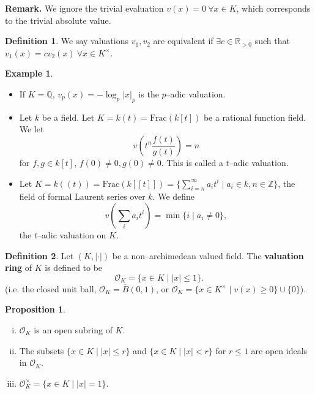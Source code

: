 \documentclass{article}
\theoremstyle{definition}
\newtheorem{prop}[theorem]{Proposition}
\newtheorem{example}{Example}[section]
\newtheorem{defn}{Definition}[section]
\begin{document}
\textbf{Remark.} We ignore the trivial evaluation $v(x)=0 ~\forall x \in K$, which  corresponds to the trivial absolute value.

\begin{defn}
    We say valuations $v_1,v_2$ are equivalent if $\exists c \in \mathbb{R}_{>0}$ such that $v_1(x) = cv_2(x) ~\forall x \in K^{\times}$.
\end{defn}
\begin{example}
    \begin{itemize}
        \item If $K=\mathbb{Q}$, $v_p(x) = -\log_p |x|_p$ is the $p$--adic valuation.
        \item Let $k$ be a field. Let $K=k(t) = \text{Frac}(k[t])$ be a rational function field. We let \[
        v\left(t^n \frac{f(t)}{g(t)}\right) = n
        \]
        for $f, g \in k[t]$, $f(0)\neq 0, g(0) \neq 0$. This is called a $t$--adic valuation.
        \item Let $K = k((t)) = \text{Frac}(k[[t]]) = \{\sum_{i=n}^{\infty} a_i t^i \mid a_i \in k, n \in \mathbb{Z}\}$, the field of formal Laurent series over $k$. We define \[
        v\left(\sum_{i}^{} a_i t^i\right) = \min \{i \mid a_i \neq 0\},
        \]
        the $t$--adic valuation on $K$.
    \end{itemize}
\end{example}
\begin{defn}
    Let $(K, |\cdot|)$ be a non--archimedean valued field. The \textbf{valuation ring} of $K$ is defined to be \[
    \mathcal{O}_K = \{x \in K \mid |x|\le 1\}.
    \]
    (i.e. the closed unit ball, $\mathcal{O}_K = \overline{B}(0,1)$, or ${\mathcal{O}_K = \{x \in K^{\times} \mid v(x) \ge  0\} \cup \{0\}}$).
\end{defn}
\begin{prop}
    \begin{enumerate}[(i)]
        \item $\mathcal{O}_K$ is an open subring of $K$.
        \item The subsets $\{x \in K \mid |x|\le r\}$ and $\{x \in K \mid |x|< r\}$ for $r\le 1$ are open ideals in $\mathcal{O}_K$.
        \item $\mathcal{O}_K^\times = \{x \in K \mid |x|=1\}$.
    \end{enumerate}
\end{prop}
\end{document}
